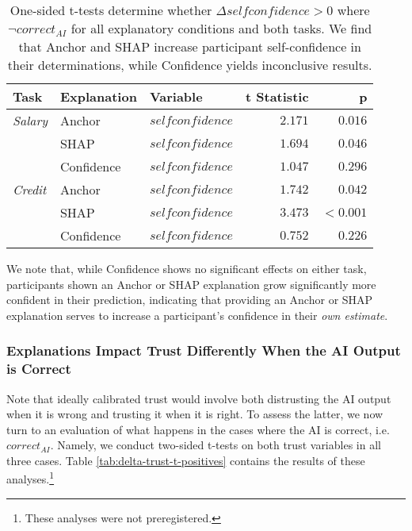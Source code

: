\begin{table}[htb]
    \centering
    \caption{One-sided t-tests determine whether $\Delta selfconfidence > 0$ where $\neg correct_{AI}$ for all explanatory conditions and both tasks. We find that Anchor and SHAP increase participant self-confidence in their determinations, while Confidence yields inconclusive results.}
    \label{tab:delta-confidence-t}
    \begin{tabular}{lllrr}
        \toprule
        Task & Explanation & Variable & t Statistic & p \\
        \midrule
        \emph{Salary} & Anchor & $selfconfidence$ & $\mathbf{2.171}$ & $\mathbf{0.016}$ \\
        & SHAP & $selfconfidence$ & $\mathbf{1.694}$ & $\mathbf{0.046}$ \\
        & Confidence & $selfconfidence$ & $1.047$ & $0.296$ \\
        \midrule
        \emph{Credit} & Anchor & $selfconfidence$ & $\mathbf{1.742}$ & $\mathbf{0.042}$ \\
        & SHAP & $selfconfidence$ & $\mathbf{3.473}$ & $\mathbf{<0.001}$ \\
        & Confidence & $selfconfidence$ & $0.752$ & $0.226$ \\
        \bottomrule
    \end{tabular}
\end{table}

We note that, while Confidence shows no significant effects on either task, participants shown an Anchor or SHAP explanation grow significantly more confident in their prediction, indicating that providing an Anchor or SHAP explanation serves to increase a participant's confidence in their \emph{own estimate}.

\subsubsection{Explanations Impact Trust Differently When the AI Output is Correct}
Note that ideally calibrated trust would involve both distrusting the AI output when it is wrong and trusting it when it is right. To assess the latter, we now turn to an evaluation of what happens in the cases where the AI is correct, i.e. $correct_{AI}$. Namely, we conduct two-sided t-tests on both trust variables in all three cases. Table \ref{tab:delta-trust-t-positives} contains the results of these analyses.\footnote{These analyses were not preregistered.}

